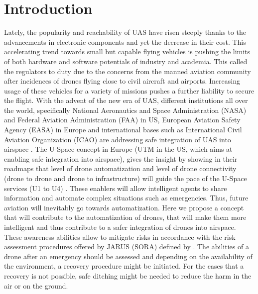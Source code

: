 
\chapter{Introduction}

Lately, the popularity and reachability of UAS have risen steeply thanks to the advancements in electronic components and yet the decrease in their cost. 
This accelerating trend towards small but capable flying vehicles is pushing the limits of both hardware and software potentials of industry and academia. 
This called the regulators to duty due to the concerns from the manned aviation community after incidences of drones flying close to civil aircraft and airports. 
Increasing usage of these vehicles for a variety of missions pushes a further liability to secure the flight.
With the advent of the new era of UAS, different institutions all over the world, specifically National Aeronautics and Space Administration (NASA) 
\cite{kopardekarunmanned} and Federal Aviation Administration (FAA) \cite{FAA_UASintegration} in US, European Aviation Safety Agency (EASA) \cite{A_NPA_EASA2015} in Europe and international bases such as International Civil Aviation Organization (ICAO) \cite{ICAO_Circular} are addressing safe integration of UAS into airspace \cite{baskaya2016flexible}.
The U-Space concept in Europe (UTM in the US, which aims at enabling safe integration into airspace), gives the insight by showing in their roadmaps that level of drone automatization and level of drone connectivity (drone to drone and drone to infrastructure) will guide the pace of the U-Space services (U1 to U4) \cite{undertaking2017u}. 
These enablers will allow intelligent agents to share information and automate complex situations such as emergencies. 
Thus, future aviation will inevitably go towards automatization. 
Here we propose a concept that will contribute to the automatization of drones, that will make them more intelligent and thus contribute to a safer integration of drones into airspace. 
These awareness abilities allow to mitigate risks in accordance with the risk assessment procedures offered by JARUS (SORA) \cite{SORA} defined by \cite{EASAopinion2018}. 
The abilities of a drone after an emergency should be assessed and depending on the availability of the environment, a recovery procedure might be initiated. 
For the cases that a recovery is not possible, safe ditching might be needed to reduce the harm in the air or on the ground. 

